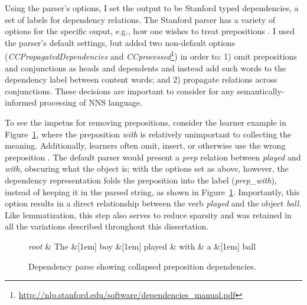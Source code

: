 Using the parser's options, I set the output to be Stanford typed dependencies, a set of labels for dependency relations. The Stanford parser has a variety of options for the specific ouput, e.g., how one wishes to treat prepositions \citep{defmarneffe:manning:12}.  I used the parser's default settings, but added two non-default options (\textit{CCPropagatedDependencies} and \textit{CCprocessed}\footnote{\url{http://nlp.stanford.edu/software/dependencies_manual.pdf}}) in order to: 1) omit prepositions and conjunctions as heads and dependents and instead add such words to the dependency label between content words; and 2) propagate relations across conjunctions.  These decisions are important to consider for any semantically-informed processing of NNS language.

To see the impetus for removing prepositions, consider the learner
example in Figure~\ref{fig:prep-dependency}, where the preposition \textit{with} is
relatively unimportant to collecting the meaning.  Additionally,
learners often omit, insert, or otherwise use the wrong preposition
\citep{chodorow:et:al:07}.  The default parser would present a
\textit{prep} relation between \textit{played} and \textit{with},
obscuring what the object is; with the options set as above, however,
the dependency representation folds the preposition into the label
(\textit{prep\_with}), instead of keeping it in the parsed string, as
shown in Figure~\ref{fig:prep-dependency}. Importantly, this option results in a direct relationship between the verb \textit{played} and the object \textit{ball}. Like lemmatization, this step also serves to reduce sparsity and was retained in all the variations described throughout this dissertation.

\begin{figure}[htb!]
\begin{center}
    \begin{dependency}[arc edge,text only label,label style={above}]
    \begin{deptext}[column sep=.5em]
      \textit{root} \& The \&[1em] boy \&[1em] played \& with \& a \&[1em] ball \\
    \end{deptext}
  \end{dependency}
\end{center}
\caption{Dependency parse showing collapsed preposition dependencies.}
\label{fig:prep-dependency}
\end{figure}

